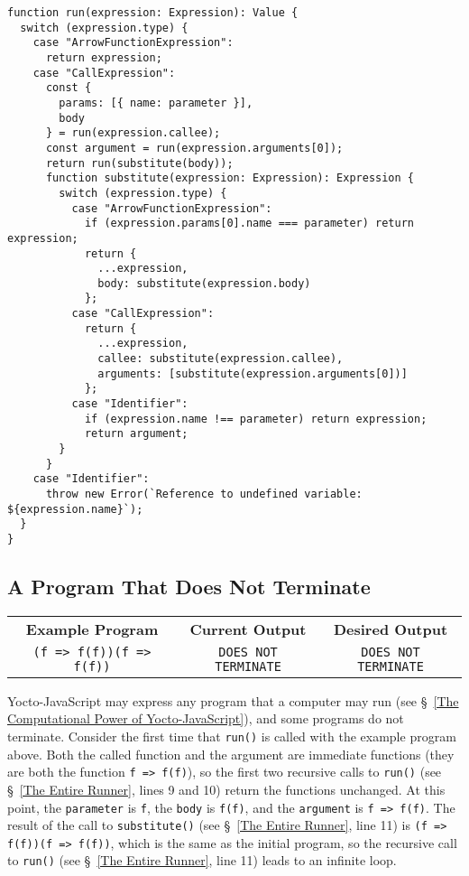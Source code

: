 \documentclass[12pt, oneside]{book}
\begin{document}
\begin{verbatim}
function run(expression: Expression): Value {
  switch (expression.type) {
    case "ArrowFunctionExpression":
      return expression;
    case "CallExpression":
      const {
        params: [{ name: parameter }],
        body
      } = run(expression.callee);
      const argument = run(expression.arguments[0]);
      return run(substitute(body));
      function substitute(expression: Expression): Expression {
        switch (expression.type) {
          case "ArrowFunctionExpression":
            if (expression.params[0].name === parameter) return expression;
            return {
              ...expression,
              body: substitute(expression.body)
            };
          case "CallExpression":
            return {
              ...expression,
              callee: substitute(expression.callee),
              arguments: [substitute(expression.arguments[0])]
            };
          case "Identifier":
            if (expression.name !== parameter) return expression;
            return argument;
        }
      }
    case "Identifier":
      throw new Error(`Reference to undefined variable: ${expression.name}`);
  }
}
\end{verbatim}

\subsection{A Program That Does Not Terminate}

\begin{center}
\begin{tabular}{c|c|c}
\textbf{Example Program} & \textbf{Current Output} & \textbf{Desired Output} \\
\texttt{(f => f(f))(f => f(f))} & \texttt{DOES NOT TERMINATE} & \texttt{DOES NOT TERMINATE} \\
\end{tabular}
\end{center}

\noindent Yocto-JavaScript may express any program that a computer may run (see §~\ref{The Computational Power of Yocto-JavaScript}), and some programs do not terminate. Consider the first time that \texttt{run()} is called with the example program above. Both the called function and the argument are immediate functions (they are both the function \texttt{f => f(f)}), so the first two recursive calls to \texttt{run()} (see §~\ref{The Entire Runner}, lines 9 and 10) return the functions unchanged. At this point, the \texttt{parameter} is \texttt{f}, the \texttt{body} is \texttt{f(f)}, and the \texttt{argument} is \texttt{f => f(f)}. The result of the call to \texttt{substitute()} (see §~\ref{The Entire Runner}, line 11) is \texttt{(f => f(f))(f => f(f))}, which is the same as the initial program, so the recursive call to \texttt{run()} (see §~\ref{The Entire Runner}, line 11) leads to an infinite loop.
\end{document}
